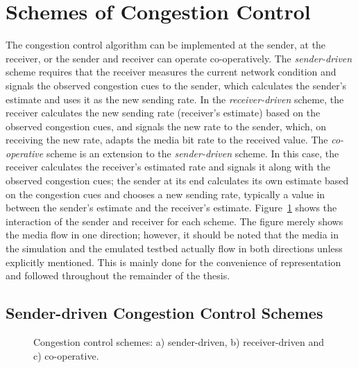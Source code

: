 \section{Schemes of Congestion Control}

The congestion control algorithm can be implemented at the sender, at the
receiver, or the sender and receiver can operate co-operatively. The
\emph{sender-driven} scheme requires that the receiver measures the current
network condition and signals the observed congestion cues to the sender, which
calculates the sender's estimate and uses it as the new sending rate. In the
\emph{receiver-driven} scheme, the receiver calculates the new sending rate
(receiver's estimate) based on the observed congestion cues, and signals the
new rate to the sender, which, on receiving the new rate, adapts the media bit
rate to the received value. The \emph{co-operative} scheme is an extension to the
\emph{sender-driven} scheme. In this case, the receiver calculates the
receiver's estimated rate and signals it along with the observed congestion
cues; the sender at its end calculates its own estimate based on the
congestion cues and chooses a new sending rate, typically a value in between the
sender's estimate and the receiver's estimate. Figure~\ref{fig:cc:scheme}
shows the interaction of the sender and receiver for each scheme. The figure
merely shows the media flow in one direction; however, it should be noted that
the media in the simulation and the emulated testbed actually flow in both
directions unless explicitly mentioned. This is mainly done for the
convenience of representation and followed throughout the remainder of the
thesis.

\subsection{Sender-driven Congestion Control Schemes}

\begin{figure}[!t]
  \centerline{
  }
  \centerline{
  }
  \centerline{
  }
  \caption{Congestion control schemes: a) sender-driven, b) receiver-driven
and c) co-operative.}
  \label{fig:cc:scheme}
\end{figure}

